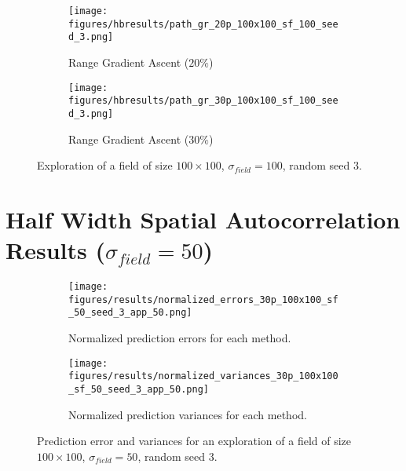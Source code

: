 \begin{figure}[htb!]
\begin{subfigure}[t]{0.32\textwidth}
        \centering
        \texttt{[image: figures/hbresults/path\_gr\_20p\_100x100\_sf\_100\_seed\_3.png]}
        \ssp
        \captionsetup{skip=0.20\baselineskip,size=footnotesize}
        \caption{Range Gradient Ascent ($20\%$)}
    \end{subfigure}%
    \begin{subfigure}[t]{0.32\textwidth}
        \centering
        \texttt{[image: figures/hbresults/path\_gr\_30p\_100x100\_sf\_100\_seed\_3.png]}
        \ssp
        \captionsetup{skip=0.20\baselineskip,size=footnotesize}
        \caption{Range Gradient Ascent ($30\%$)}
    \end{subfigure}%
    \ssp
    \captionsetup{skip=0.20\baselineskip}
    \caption{Exploration of a field of size $100 \times 100$, $\sigma_{field} = 100$, random seed 3.}
    \label{fig:s3_sf100}
\end{figure}

\FloatBarrier
\clearpage

\section{Half Width Spatial Autocorrelation Results ($\sigma_{field} = 50$)} \label{sec:s3_sigma50}
\begin{figure}[htb!]
    \centering
    \begin{subfigure}[t]{0.5\textwidth}
        \centering
        \texttt{[image: figures/results/normalized\_errors\_30p\_100x100\_sf\_50\_seed\_3\_app\_50.png]}
        \ssp
        \captionsetup{skip=0.20\baselineskip,size=footnotesize}
        \caption{Normalized prediction errors for each method.}
    \end{subfigure}%
    \begin{subfigure}[t]{0.5\textwidth}
        \centering
        \texttt{[image: figures/results/normalized\_variances\_30p\_100x100\_sf\_50\_seed\_3\_app\_50.png]}
        \ssp
        \captionsetup{skip=0.20\baselineskip,size=footnotesize}
        \caption{Normalized prediction variances for each method.}
    \end{subfigure}%
    \ssp
    \captionsetup{skip=0.20\baselineskip}
    \caption{Prediction error and variances for an exploration of a field of size $100 \times 100$, $\sigma_{field} = 50$, random seed 3.}
    \label{fig:s3_errvar50}
\end{figure}

